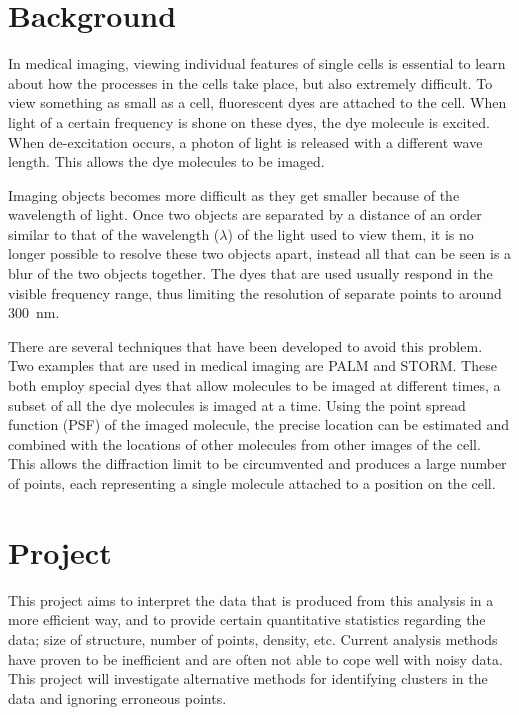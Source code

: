 \section{Background}
\label{sec:background}

In medical imaging, viewing individual features of single cells is essential to
learn about how the processes in the cells take place, but also extremely
difficult. To view something as small as a cell, fluorescent dyes are attached
to the cell. When light of a certain frequency is shone on these dyes, the dye
molecule is excited. When de-excitation occurs, a photon of light is released
with a different wave length. This allows the dye molecules to be imaged.

Imaging objects becomes more difficult as they get smaller because of the
wavelength of light. Once two objects are separated by a distance of an order
similar to that of the wavelength ($\lambda$) of the light used to view them,
it is no longer possible to resolve these two objects apart, instead all that
can be seen is a blur of the two objects together. The dyes that are used
usually respond in the visible frequency range, thus limiting the resolution of
separate points to around \SI{300}{\nano\metre}.

There are several techniques that have been developed to avoid this problem.
Two examples that are used in medical imaging are PALM\cite{owen2010palm} and
STORM\cite{rust2006sub}. These both employ special dyes that allow molecules
to be imaged at different times, a subset of all the dye molecules is imaged at
a time. Using the point spread function (PSF) of the imaged molecule, the
precise location can be estimated and combined with the locations of other
molecules from other images of the cell. This allows the diffraction limit to
be circumvented and produces a large number of points, each representing a
single molecule attached to a position on the cell.

\section{Project}
\label{sec:project}

This project aims to interpret the data that is produced from this analysis in
a more efficient way, and to provide certain quantitative statistics regarding
the data; size of structure, number of points, density, etc. Current analysis
methods have proven to be inefficient and are often not able to cope well with
noisy data. This project will investigate alternative methods for identifying
clusters in the data and ignoring erroneous points.

